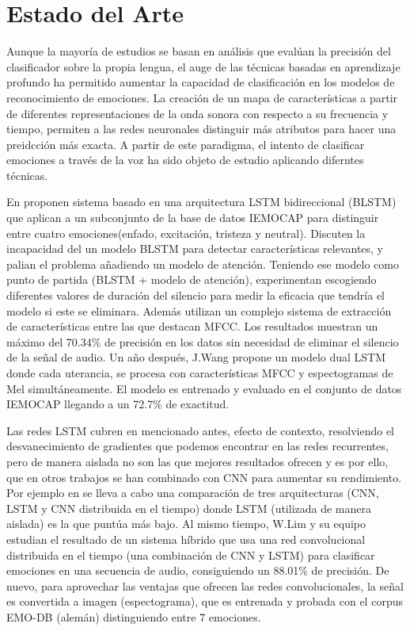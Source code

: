 \documentclass[11pt,a4paper,spanish]{book}
\begin{document}
	

	
	\section{Estado del Arte}
	\label{lb_estado_arte}
	Aunque la mayoría de estudios se basan en análisis que evalúan la precisión del clasificador sobre la propia lengua, el auge de las técnicas basadas en aprendizaje profundo ha permitido aumentar la capacidad de clasificación en los modelos de reconocimiento de emociones. La creación de un mapa de características a partir de diferentes representaciones de la onda sonora con respecto a su frecuencia y tiempo, permiten a las redes neuronales distinguir más atributos para hacer una preidcción más exacta. A partir de este paradigma, el intento de clasificar emociones a través de la voz ha sido objeto de estudio aplicando diferntes técnicas.

	En \cite{Atmaja2019} proponen sistema basado en una arquitectura LSTM bidireccional (BLSTM) que aplican a un subconjunto de la base de datos IEMOCAP para distinguir entre cuatro emociones(enfado, excitación, tristeza y neutral). Discuten la incapacidad del un modelo BLSTM para detectar características relevantes, y palian el problema añadiendo un modelo de atención. Teniendo ese modelo como punto de partida (BLSTM + modelo de atención), experimentan escogiendo diferentes valores de duración del silencio para medir la eficacia que tendría el modelo si este se eliminara. Además utilizan un complejo sistema de extracción de características entre las que destacan MFCC. Los resultados muestran un máximo del 70.34\% de precisión en los datos sin necesidad de eliminar el silencio de la señal de audio.
	Un año después, J.Wang \cite{Wang2020} propone un modelo dual LSTM donde cada uterancia, se procesa con características MFCC y espectogramas de Mel simultáneamente. El modelo es entrenado y evaluado en el conjunto de datos IEMOCAP llegando a un 72.7\% de exactitud.
		
	Las redes LSTM cubren en mencionado antes, efecto de contexto, resolviendo el desvanecimiento de gradientes que podemos encontrar en las redes recurrentes, pero de manera aislada no son las que mejores resultados ofrecen y es por ello, que en otros trabajos se han combinado con CNN para aumentar su rendimiento. Por ejemplo en \cite{Lim2017} se lleva a cabo una comparación de tres  arquitecturas (CNN, LSTM y CNN distribuida en el tiempo) donde LSTM (utilizada de manera aislada) es la que puntúa más bajo. Al mismo tiempo, W.Lim y su equipo estudian el resultado de un sistema híbrido que usa una red convolucional distribuida en el tiempo (una combinación de CNN y LSTM) para clasificar emociones en una secuencia de audio, consiguiendo un 88.01\% de precisión. De nuevo, para aprovechar las ventajas que ofrecen las redes convolucionales, la señal es convertida a imagen (espectograma), que es entrenada y probada con el corpus EMO-DB (alemán) distinguiendo entre 7 emociones.
	
\end{document}
